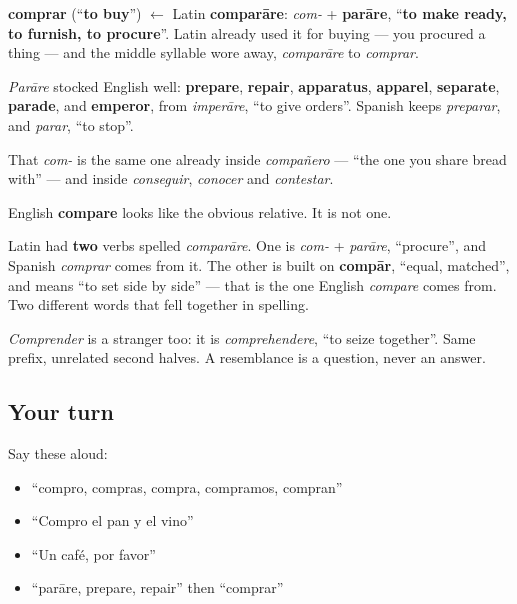 \begin{cousinweb}
\textbf{comprar} (\textquotedblleft{}\textbf{to buy}\textquotedblright{}) $\leftarrow$ Latin \textbf{comparāre}: \emph{com-} + \textbf{parāre}, \textquotedblleft{}\textbf{to make ready, to furnish, to procure}\textquotedblright{}. Latin already used it for buying — you procured a thing — and the middle syllable wore away, \emph{comparāre} to \emph{comprar}.

\emph{Parāre} stocked English well: \textbf{prepare}, \textbf{repair}, \textbf{apparatus}, \textbf{apparel}, \textbf{separate}, \textbf{parade}, and \textbf{emperor}, from \emph{imperāre}, \textquotedblleft{}to give orders\textquotedblright{}. Spanish keeps \emph{preparar}, and \emph{parar}, \textquotedblleft{}to stop\textquotedblright{}.

That \emph{com-} is the same one already inside \emph{compañero} — \textquotedblleft{}the one you share bread with\textquotedblright{} — and inside \emph{conseguir}, \emph{conocer} and \emph{contestar}.
\end{cousinweb}

\begin{culture}
English \textbf{compare} looks like the obvious relative. It is not one.

Latin had \textbf{two} verbs spelled \emph{comparāre}. One is \emph{com-} + \emph{parāre}, \textquotedblleft{}procure\textquotedblright{}, and Spanish \emph{comprar} comes from it. The other is built on \textbf{compār}, \textquotedblleft{}equal, matched\textquotedblright{}, and means \textquotedblleft{}to set side by side\textquotedblright{} — that is the one English \emph{compare} comes from. Two different words that fell together in spelling.

\emph{Comprender} is a stranger too: it is \emph{comprehendere}, \textquotedblleft{}to seize together\textquotedblright{}. Same prefix, unrelated second halves. A resemblance is a question, never an answer.
\end{culture}

\subsection*{Your turn}
Say these aloud:

\begin{itemize}
\raggedright
  \item \textquotedblleft{}compro, compras, compra, compramos, compran\textquotedblright{}
  \item \textquotedblleft{}Compro el pan y el vino\textquotedblright{}
  \item \textquotedblleft{}Un café, por favor\textquotedblright{}
  \item \textquotedblleft{}parāre, prepare, repair\textquotedblright{} then \textquotedblleft{}comprar\textquotedblright{}
\end{itemize}

